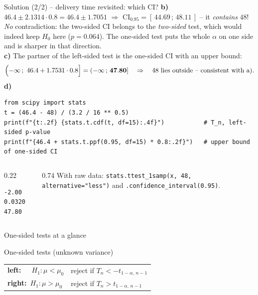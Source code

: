 \documentclass[aspectratio=169,11pt]{beamer}
\begin{document}
\begin{frame}[fragile]{Solution (2/2) -- delivery time revisited: which CI?}
  \textbf{b)} $46.4\pm2.1314\cdot0.8=46.4\pm1.7051$ $\Rightarrow$
  $\text{CI}_{0.95}=\mathbf{[\,44.69\,;\,48.11\,]}$ -- it \emph{contains}
  $48$! \emph{No} contradiction: the two-sided CI belongs to the
  \emph{two-sided} test, which would indeed keep $H_0$ here ($p=0.064$). The
  one-sided test puts the whole $\alpha$ on one side and is sharper in that
  direction.\\[3pt]
  \textbf{c)} The partner of the left-sided test is the one-sided CI with an
  upper bound:
  \[
    \Bigl(-\infty\,;\ 46.4+1.7531\cdot0.8\Bigr]=\mathbf{(-\infty\,;\,47.80]}
    \quad\Rightarrow\quad 48\ \text{lies outside -- consistent with a).}
  \]
  \textbf{d)} \vspace{-6pt}
\begin{lstlisting}
from scipy import stats
t = (46.4 - 48) / (3.2 / 16 ** 0.5)
print(f"{t:.2f} {stats.t.cdf(t, df=15):.4f}")           # T_n, left-sided p-value
print(f"{46.4 + stats.t.ppf(0.95, df=15) * 0.8:.2f}")   # upper bound of one-sided CI
\end{lstlisting}
  \vspace{-4pt}
  \begin{columns}[T]
    \begin{column}{0.22\textwidth}
\begin{lstlisting}[style=Pyout]
-2.00 0.0320
47.80
\end{lstlisting}
    \end{column}
    \begin{column}{0.74\textwidth}
      \footnotesize With raw data: \texttt{stats.ttest\_1samp(x, 48,
      alternative="less")} and \texttt{.confidence\_interval(0.95)}.
    \end{column}
  \end{columns}
\end{frame}

\begin{frame}{One-sided tests at a glance}
  \begin{block}{One-sided tests (unknown variance)}
    \begin{tabular}{ll}
      \textbf{left:}\ \ \, $H_1:\mu<\mu_0$ & reject if $T_n<-t_{1-\alpha,\,n-1}$\\[2pt]
      \textbf{right:}\ $H_1:\mu>\mu_0$ & reject if $T_n> t_{1-\alpha,\,n-1}$
    \end{tabular}
  \end{block}
\end{frame}
\end{document}
